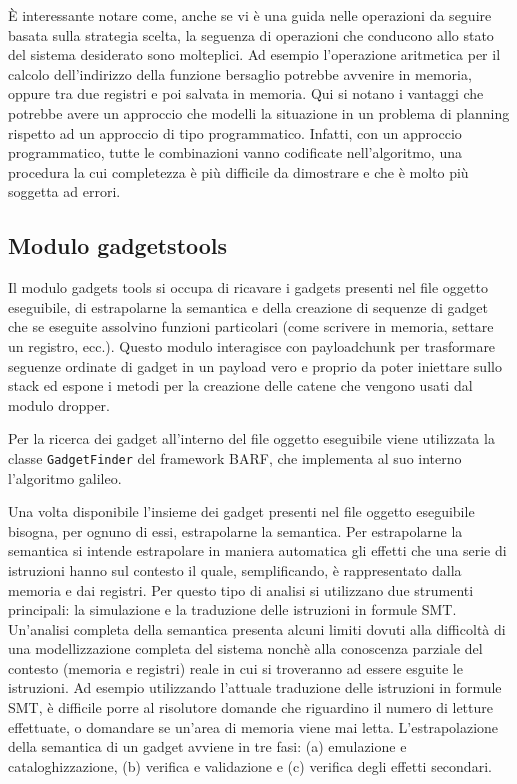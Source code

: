 È interessante notare come, anche se vi è una guida nelle operazioni
da seguire basata sulla strategia scelta, la seguenza di operazioni
che conducono allo stato del sistema desiderato sono molteplici. Ad
esempio l'operazione aritmetica per il calcolo dell'indirizzo della
funzione bersaglio potrebbe avvenire in memoria, oppure tra due
registri e poi salvata in memoria. Qui si notano i vantaggi che
potrebbe avere un approccio che modelli la situazione in un problema
di planning rispetto ad un approccio di tipo programmatico. Infatti,
con un approccio programmatico, tutte le combinazioni vanno codificate
nell'algoritmo, una procedura la cui completezza è più difficile da
dimostrare e che è molto più soggetta ad errori.

\subsection{Modulo gadgetstools}

Il modulo gadgets tools si occupa di ricavare i gadgets presenti nel
file oggetto eseguibile, di estrapolarne la semantica e della
creazione di sequenze di gadget che se eseguite assolvino funzioni
particolari (come scrivere in memoria, settare un registro,
ecc.). Questo modulo interagisce con payloadchunk per trasformare
seguenze ordinate di gadget in un payload vero e proprio da poter
iniettare sullo stack ed espone i metodi per la creazione delle catene
che vengono usati dal modulo dropper.

Per la ricerca dei gadget all'interno del file oggetto eseguibile
viene utilizzata la classe \lstinline{GadgetFinder} del framework
BARF, che implementa al suo interno l'algoritmo galileo\cite{roemer-12}. 


Una volta disponibile l'insieme dei gadget presenti nel file oggetto
eseguibile bisogna, per ognuno di essi, estrapolarne la semantica. Per
estrapolarne la semantica si intende estrapolare in maniera automatica
gli effetti che una serie di istruzioni hanno sul contesto il quale,
semplificando, è rappresentato dalla memoria e dai registri. Per
questo tipo di analisi si utilizzano due strumenti principali: la
simulazione e la traduzione delle istruzioni in formule
SMT. Un'analisi completa della semantica presenta alcuni limiti dovuti
alla difficoltà di una modellizzazione completa del sistema nonchè
alla conoscenza parziale del contesto (memoria e registri) reale in
cui si troveranno ad essere esguite le istruzioni. Ad esempio
utilizzando l'attuale traduzione delle istruzioni in formule SMT, è
difficile porre al risolutore domande che riguardino il numero di
letture effettuate, o domandare se un'area di memoria viene mai
letta. L'estrapolazione della semantica di un gadget avviene in tre
fasi: (a) emulazione e cataloghizzazione, (b) verifica e validazione e
(c) verifica degli effetti secondari.

